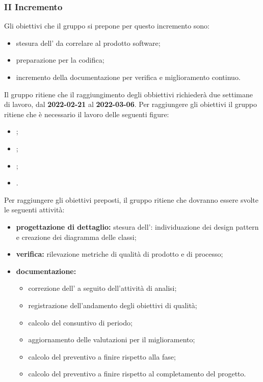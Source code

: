 \pagebreak

\subsubsection{II Incremento}
Gli obiettivi che il gruppo si prepone per questo incremento sono:
\begin{itemize}
	\item stesura dell'{\SA} da correlare al prodotto software;
	\item preparazione per la codifica;
 \item incremento della documentazione per verifica e miglioramento continuo.
\end{itemize}
Il gruppo ritiene che il raggiungimento degli obbiettivi richiederà due settimane di lavoro, dal \textbf{2022-02-21} al \textbf{2022-03-06}.
Per raggiungere gli obiettivi il gruppo ritiene che è necessario il lavoro delle seguenti figure:
\begin{itemize}
	\item \RE{};
 	\item \AM{};
   	\item \PT{};
   	\item \VE{}.
\end{itemize}
Per raggiungere gli obiettivi preposti, il gruppo ritiene che dovranno essere svolte le seguenti attività:
\begin{itemize}
	\item \textbf{progettazione di dettaglio:} stesura dell’{\SA}: individuazione dei design pattern e creazione dei diagramma delle classi;
 	\item \textbf{verifica:} rilevazione metriche di qualità di prodotto e di processo;
	\item \textbf{documentazione:} 
	 \begin{itemize}
		 \item correzione dell’\AdR{} a seguito dell’attività di analisi;
		   \item registrazione dell’andamento degli obiettivi di qualità;
		   \item calcolo del consuntivo di periodo;
		  \item aggiornamento delle valutazioni per il miglioramento; 
		  \item calcolo del preventivo a finire rispetto alla fase;
			\item calcolo del preventivo a finire rispetto al completamento del progetto.
	 \end{itemize}
\end{itemize}

